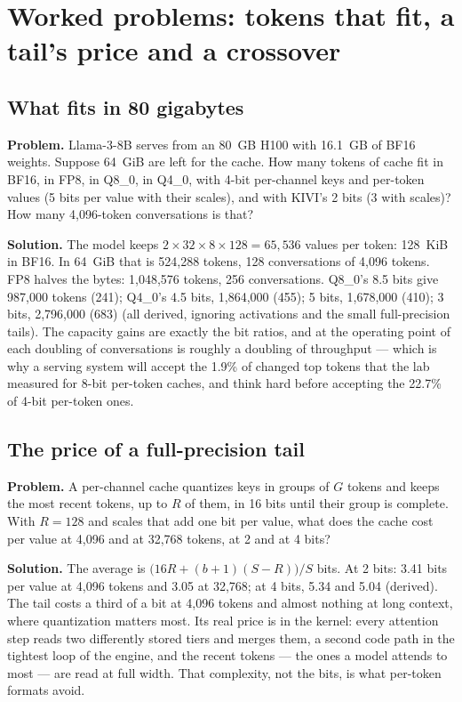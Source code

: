\section{Worked problems: tokens that fit, a tail's price and a crossover}

\subsection{What fits in 80 gigabytes}
\textbf{Problem.} Llama-3-8B serves from an 80~GB H100 with 16.1~GB of BF16
weights. Suppose 64~GiB are left for the cache. How many tokens of cache fit in
BF16, in FP8, in Q8\_0, in Q4\_0, with 4-bit per-channel keys and per-token
values (5 bits per value with their scales), and with KIVI's 2 bits (3 with
scales)? How many 4,096-token conversations is that?

\textbf{Solution.} The model keeps $2 \times 32 \times 8 \times 128 = 65{,}536$
values per token: 128~KiB in BF16. In 64~GiB that is 524,288 tokens, 128
conversations of 4,096 tokens. FP8 halves the bytes: 1,048,576 tokens, 256
conversations. Q8\_0's 8.5 bits give 987,000 tokens (241); Q4\_0's 4.5 bits,
1,864,000 (455); 5 bits, 1,678,000 (410); 3 bits, 2,796,000 (683) (all derived,
ignoring activations and the small full-precision tails). The capacity gains are
exactly the bit ratios, and at the operating point of  each
doubling of conversations is roughly a doubling of throughput --- which is why
a serving system will accept the 1.9\% of changed top tokens that the lab
measured for 8-bit per-token caches, and think hard before accepting the 22.7\%
of 4-bit per-token ones.

\subsection{The price of a full-precision tail}
\textbf{Problem.} A per-channel cache quantizes keys in groups of $G$ tokens and
keeps the most recent tokens, up to $R$ of them, in 16 bits until their group
is complete. With $R = 128$ and scales that add one bit per value, what does the
cache cost per value at 4,096 and at 32,768 tokens, at 2 and at 4 bits?

\textbf{Solution.} The average is $\bigl(16R + (b + 1)(S - R)\bigr)/S$ bits. At
2 bits: 3.41 bits per value at 4,096 tokens and 3.05 at 32,768; at 4 bits, 5.34
and 5.04 (derived). The tail costs a third of a bit at 4,096 tokens and almost
nothing at long context, where quantization matters most. Its real price is in
the kernel: every attention step reads two differently stored tiers and merges
them, a second code path in the tightest loop of the engine, and the recent
tokens --- the ones a model attends to most --- are read at full width. That
complexity, not the bits, is what per-token formats avoid.

